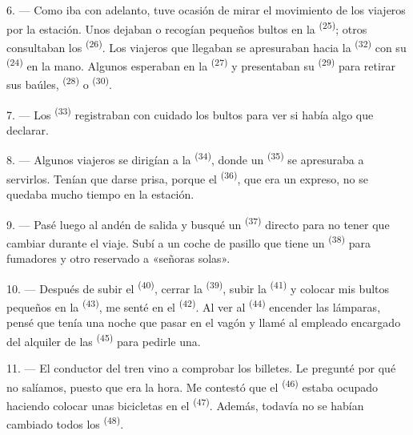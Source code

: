 6. --- Como iba con adelanto, tuve ocasión de mirar el movimiento de los
viajeros por la estación. Unos dejaban o recogían pequeños bultos en la
 \textsuperscript{(25)}; otros consultaban los 
\textsuperscript{(26)}. Los viajeros que llegaban se apresuraban hacia la
 \textsuperscript{(32)} con su  \textsuperscript{(24)} en la
mano. Algunos esperaban en la  \textsuperscript{(27)} y
presentaban su  \textsuperscript{(29)} para retirar sus baúles,
 \textsuperscript{(28)} o  \textsuperscript{(30)}.

7. --- Los  \textsuperscript{(33)} registraban con
cuidado los bultos para ver si había algo que declarar.

8. --- Algunos viajeros se dirigían a la  \textsuperscript{(34)}, donde
un  \textsuperscript{(35)} se apresuraba a servirlos. Tenían que
darse prisa, porque el  \textsuperscript{(36)}, que era un expreso, no se
quedaba mucho tiempo en la estación.

9. --- Pasé luego al andén de salida y busqué un 
\textsuperscript{(37)} directo para no tener que cambiar durante el viaje. Subí a
un coche de pasillo que tiene un  \textsuperscript{(38)} para
fumadores y otro reservado a «señoras solas».

\VUsaut{3.0mm}

10. --- Después de subir el  \textsuperscript{(40)}, cerrar la
 \textsuperscript{(39)}, subir la  \textsuperscript{(41)} y
colocar mis bultos pequeños en la  \textsuperscript{(43)}, me senté en
el  \textsuperscript{(42)}. Al ver al  \textsuperscript{(44)}
encender las lámparas, pensé que tenía una noche que pasar en el vagón y
llamé al empleado encargado del alquiler de las 
\textsuperscript{(45)} para pedirle una.

11. --- El conductor del tren vino a comprobar los billetes. Le pregunté
por qué no salíamos, puesto que era la hora. Me contestó que el
 \textsuperscript{(46)} estaba ocupado haciendo colocar unas
bicicletas en el  \textsuperscript{(47)}. Además, todavía no se habían
cambiado todos los  \textsuperscript{(48)}.

